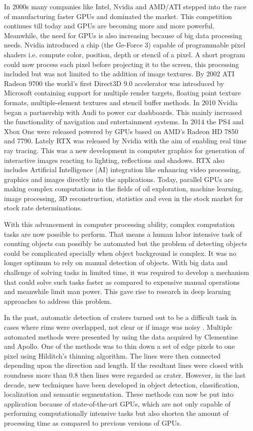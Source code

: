 \documentclass[11pt]{article}
\begin{document}
In 2000s many companies like Intel, Nvidia and AMD/ATI stepped into the race of manufacturing faster GPUs and dominated the market. This competition continues till today and GPUs are becoming more and more powerful. Meanwhile, the need for GPUs is also increasing because of big data processing needs. Nvidia introduced a chip (the Ge-Force 3) capable of programmable pixel shaders i.e. compute color, position, depth or stencil of a pixel. A short program could now process each pixel before projecting it to the screen, this processing included but was not limited to the addition of image textures. By 2002 ATI Radeon 9700 the world's first Direct3D 9.0 accelerator was introduced by Microsoft containing support for multiple render targets, floating point texture formats, multiple-element textures and stencil buffer methods. In 2010 Nvidia began a partnership with Audi to power car dashboards. This mainly increased the functionality of navigation and entertainment systems. In 2014 the PS4 and Xbox One were released powered by GPUs based on AMD's Radeon HD 7850 and 7790. Lately RTX was released by Nvidia with the aim of enabling real time ray tracing. This was a new development in computer graphics for generation of interactive images reacting to lighting, reflections and shadows. RTX also includes Artificial Intelligence (AI) integration like enhancing video processing, graphics and images directly into the applications. Today, parallel GPUs are making complex computations in the fields of oil exploration, machine learning, image processing, 3D reconstruction, statistics and even in the stock market for stock rate determinations.

With this advancement in computer processing ability, complex computation tasks are now possible to perform. That means a human labor intensive task of counting objects can possibly be automated but the problem of detecting objects could be complicated specially when object background is complex. It was no longer optimum to rely on manual detection of objects. With big data and challenge of solving tasks in limited time, it was required to develop a mechanism that could solve such tasks faster as compared to expensive manual operations and meanwhile limit man power. This gave rise to research in deep learning approaches to address this problem.

In the past, automatic detection of craters turned out to be a difficult task in cases where rims were overlapped, not clear or if image was noisy \cite{sawabe_2006}. Multiple automated methods were presented by \cite{sawabe_2006} using the data acquired by Clementine and Apollo. One of the methods was to thin down a set of edge pixels to one pixel using Hilditch's thinning algorithm. The lines were then connected depending upon the direction and length. If the resultant lines were closed with roundness more than 0.8 then lines were regarded as crater. However, in the last decade, new techniques have been developed in object detection, classification, localization and semantic segmentation. These methods can now be put into application because of state-of-the-art GPUs, which are not only capable of performing computationally intensive tasks but also shorten the amount of processing time as compared to previous versions of GPUs.
\end{document}

